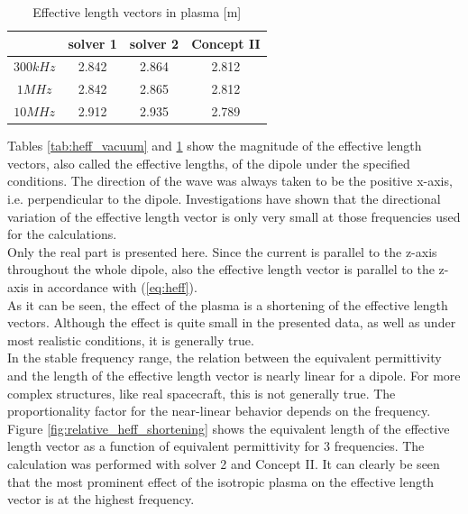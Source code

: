 \documentclass[two-coloumn,ras]{agutex}
\begin{document}
\begin{article}
\begin{table}
\caption{Effective length vectors in plasma [m]}
\label{tab:heff_plasma}
\begin{tabular}{|c|c|c|c|}
 \hline
 & solver 1  & solver 2  & Concept II \\
\hline
$300 kHz$ & 2.842 & 2.864 & 2.812  \\
$1 MHz$ & 2.842 & 2.865 & 2.812  \\
$10 MHz$ & 2.912 & 2.935 & 2.789 \\
\hline
\end{tabular}
\end{table}

Tables \ref{tab:heff_vacuum} and \ref{tab:heff_plasma} show the magnitude of the effective length vectors, also called the effective lengths, of the dipole under the specified conditions. The direction of the wave was always taken to be the positive x-axis, i.e. perpendicular to the dipole. Investigations have shown that the directional variation of the effective length vector is only very small at those frequencies used for the calculations.\\

Only the real part is presented here. Since the current is parallel to the z-axis throughout the whole dipole, also the effective length vector is parallel to the z-axis in accordance with (\ref{eq:heff}).\\

As it can be seen, the effect of the plasma is a shortening of the effective length vectors. Although the effect is quite small in the presented data, as well as under most realistic conditions, it is generally true.\\

In the stable frequency range, the relation between the equivalent permittivity and the length of the effective length vector is nearly linear for a dipole. For more complex structures, like real spacecraft, this is not generally true. The proportionality factor for the near-linear behavior depends on the frequency. Figure \ref{fig:relative_heff_shortening} shows the equivalent length of the effective length vector as a function of equivalent permittivity for 3 frequencies. The calculation was performed with solver 2 and Concept II. It can clearly be seen that the most prominent effect of the isotropic plasma on the effective length vector is at the highest frequency.\\


\end{article}
\end{document}
